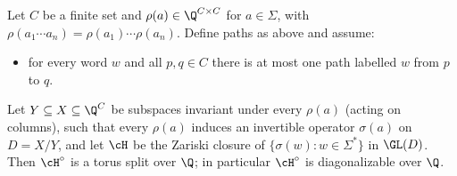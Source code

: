 \begin{lemma}\label{lem:component}
Let $C$ be a finite set and $\rho(a)\in\Q^{C\times C}$ for $a\in\Sigma$, with
$\rho(a_1\cdots a_n)=\rho(a_1)\cdots\rho(a_n)$. Define paths as above and assume:
\begin{itemize}
\item[(U)] for every word $w$ and all $p,q\in C$ there is at most one path labelled $w$ from $p$ to $q$.
\end{itemize}
Let $Y\subseteq X\subseteq\Q^C$ be subspaces invariant under every $\rho(a)$ (acting on columns), such
that every $\rho(a)$ induces an invertible operator $\sigma(a)$ on $D=X/Y$, and let $\cH$ be the
Zariski closure of $\{\sigma(w):w\in\Sigma^*\}$ in $\GL(D)$. Then $\cH^\circ$ is a torus split over
$\Q$; in particular $\cH^\circ$ is diagonalizable over $\Q$.
\end{lemma}
